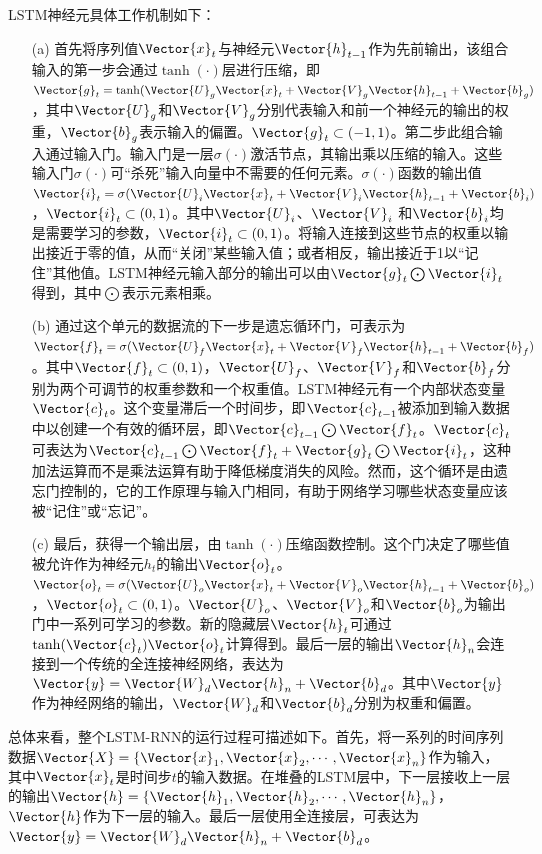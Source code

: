 LSTM神经元具体工作机制如下：
\begin{enumerate}
  \item[(a)] 首先将序列值$\Vector{x}_t$与神经元$\Vector{h}_{t-1}$作为先前输出，该组合输入的第一步会通过$\tanh(\cdot)$层进行压缩，即$\Vector{g}_t=\tanh(\Vector{U}_g \Vector{x}_t+\Vector{V}_g\Vector{h}_{t-1}+\Vector{b}_g)$，其中$\Vector{U}_g$和$\Vector{V}_g$分别代表输入和前一个神经元的输出的权重，$\Vector{b}_g$表示输入的偏置。$\Vector{g}_t\subset(-1,1)$。第二步此组合输入通过输入门。输入门是一层$\sigma(\cdot)$激活节点，其输出乘以压缩的输入。这些输入门$\sigma(\cdot)$可“杀死”输入向量中不需要的任何元素。$\sigma(\cdot)$函数的输出值$\Vector{i}_t=\sigma(\Vector{U}_i \Vector{x}_t+\Vector{V}_i\Vector{h}_{t-1}+\Vector{b}_i)$，$\Vector{i}_t\subset(0,1)$。其中$\Vector{U}_i$、$\Vector{V}_i$ 和$\Vector{b}_i$均是需要学习的参数，$\Vector{i}_t\subset(0,1)$。将输入连接到这些节点的权重以输出接近于零的值，从而“关闭”某些输入值；或者相反，输出接近于1以“记住”其他值。LSTM神经元输入部分的输出可以由$\Vector{g}_t\bigodot\Vector{i}_t$得到，其中$\bigodot$表示元素相乘。
  \item[(b)] 通过这个单元的数据流的下一步是遗忘循环门，可表示为$\Vector{f}_t=\sigma(\Vector{U}_f\Vector{x}_t+\Vector{V}_f\Vector{h}_{t-1}+\Vector{b}_f)$。其中$\Vector{f}_t\subset(0,1)$，$\Vector{U}_f$、$\Vector{V}_f$和$\Vector{b}_f$分别为两个可调节的权重参数和一个权重值。LSTM神经元有一个内部状态变量$\Vector{c}_t$。这个变量滞后一个时间步，即$\Vector{c}_{t-1}$被添加到输入数据中以创建一个有效的循环层，即$\Vector{c}_{t-1}\bigodot\Vector{f}_t$。$\Vector{c}_t$可表达为$\Vector{c}_{t-1}\bigodot\Vector{f}_t+\Vector{g}_t\bigodot\Vector{i}_t$，这种加法运算而不是乘法运算有助于降低梯度消失的风险。然而，这个循环是由遗忘门控制的，它的工作原理与输入门相同，有助于网络学习哪些状态变量应该被“记住”或“忘记”。
  \item[(c)] 最后，获得一个输出层，由$\tanh(\cdot)$压缩函数控制。这个门决定了哪些值被允许作为神经元$h_t$的输出$\Vector{o}_t$。$\Vector{o}_t=\sigma(\Vector{U}_o\Vector{x}_t+\Vector{V}_o\Vector{h}_{t-1}+\Vector{b}_o)$，$\Vector{o}_t\subset(0,1)$。$\Vector{U}_o$、$\Vector{V}_o$和$\Vector{b}_o$为输出门中一系列可学习的参数。新的隐藏层$\Vector{h}_t$可通过$\tanh(\Vector{c}_t)\Vector{o}_t$计算得到。最后一层的输出$\Vector{h}_n$会连接到一个传统的全连接神经网络，表达为$\Vector{y}=\Vector{W}_d\Vector{h}_n+\Vector{b}_d$。其中$\Vector{y}$作为神经网络的输出，$\Vector{W}_d$和$\Vector{b}_d$分别为权重和偏置。
\end{enumerate}

总体来看，整个LSTM-RNN的运行过程可描述如下。首先，将一系列的时间序列数据$\Vector{X}=\{\Vector{x}_1,\Vector{x}_2,\cdots,\Vector{x}_n\}$作为输入，其中$\Vector{x}_t$是时间步$t$的输入数据。在堆叠的LSTM层中，下一层接收上一层的输出$\Vector{h}=\{\Vector{h}_1,\Vector{h}_2,\cdots,\Vector{h}_n\}$，$\Vector{h}$作为下一层的输入。最后一层使用全连接层，可表达为$\Vector{y}=\Vector{W}_d\Vector{h}_n+\Vector{b}_d$。

